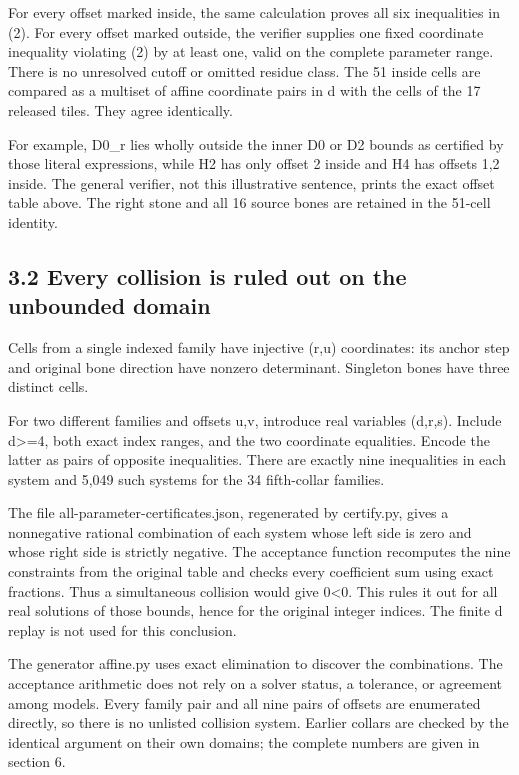 \documentclass[
  10pt,
]{scrreprt}
\begin{document}
For every offset marked inside, the same calculation proves all six
inequalities in (2). For every offset marked outside, the verifier
supplies one fixed coordinate inequality violating (2) by at least one,
valid on the complete parameter range. There is no unresolved cutoff or
omitted residue class. The 51 inside cells are compared as a multiset of
affine coordinate pairs in d with the cells of the 17 released tiles.
They agree identically.

For example, D0\_r lies wholly outside the inner D0 or D2 bounds as
certified by those literal expressions, while H2 has only offset 2
inside and H4 has offsets 1,2 inside. The general verifier, not this
illustrative sentence, prints the exact offset table above. The right
stone and all 16 source bones are retained in the 51-cell identity.

\subsection{3.2 Every collision is ruled out on the unbounded
domain}\label{edition-7-section-8}

Cells from a single indexed family have injective (r,u) coordinates: its
anchor step and original bone direction have nonzero determinant.
Singleton bones have three distinct cells.

For two different families and offsets u,v, introduce real variables
(d,r,s). Include d\textgreater=4, both exact index ranges, and the two
coordinate equalities. Encode the latter as pairs of opposite
inequalities. There are exactly nine inequalities in each system and
5,049 such systems for the 34 fifth-collar families.

The file all-parameter-certificates.json, regenerated by certify.py,
gives a nonnegative rational combination of each system whose left side
is zero and whose right side is strictly negative. The acceptance
function recomputes the nine constraints from the original table and
checks every coefficient sum using exact fractions. Thus a simultaneous
collision would give 0\textless0. This rules it out for all real
solutions of those bounds, hence for the original integer indices. The
finite d replay is not used for this conclusion.

The generator affine.py uses exact elimination to discover the
combinations. The acceptance arithmetic does not rely on a solver
status, a tolerance, or agreement among models. Every family pair and
all nine pairs of offsets are enumerated directly, so there is no
unlisted collision system. Earlier collars are checked by the identical
argument on their own domains; the complete numbers are given in section
6.
\end{document}
